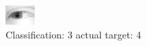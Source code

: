 \begin{figure}[h!]
\begin{center}
\includegraphics[width=0.60\columnwidth]{figures/ID2413_class_3_target_4.png}
\end{center}
\caption{ Classification: 3 actual target: 4}
\label{fig:ID2413_class_3_target_4}
\end{figure}
